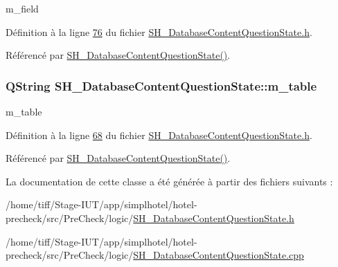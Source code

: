 m\-\_\-field 



Définition à la ligne \hyperlink{SH__DatabaseContentQuestionState_8h_source_l00076}{76} du fichier \hyperlink{SH__DatabaseContentQuestionState_8h_source}{S\-H\-\_\-\-Database\-Content\-Question\-State.\-h}.



Référencé par \hyperlink{classSH__DatabaseContentQuestionState_ab26490ea519262a8f9ca72c000bf7313}{S\-H\-\_\-\-Database\-Content\-Question\-State()}.

\hypertarget{classSH__DatabaseContentQuestionState_a95d8a6ffc051cd9283314a56f7a11296}{
\subsubsection[{m\-\_\-table}]{\setlength{\rightskip}{0pt plus 5cm}Q\-String S\-H\-\_\-\-Database\-Content\-Question\-State\-::m\-\_\-table\hspace{0.3cm}{\ttfamily [private]}}}\label{classSH__DatabaseContentQuestionState_a95d8a6ffc051cd9283314a56f7a11296}


m\-\_\-table 



Définition à la ligne \hyperlink{SH__DatabaseContentQuestionState_8h_source_l00068}{68} du fichier \hyperlink{SH__DatabaseContentQuestionState_8h_source}{S\-H\-\_\-\-Database\-Content\-Question\-State.\-h}.



Référencé par \hyperlink{classSH__DatabaseContentQuestionState_ab26490ea519262a8f9ca72c000bf7313}{S\-H\-\_\-\-Database\-Content\-Question\-State()}.



La documentation de cette classe a été générée à partir des fichiers suivants \-:\begin{DoxyCompactItemize}
\item 
/home/tiff/\-Stage-\/\-I\-U\-T/app/simplhotel/hotel-\/precheck/src/\-Pre\-Check/logic/\hyperlink{SH__DatabaseContentQuestionState_8h}{S\-H\-\_\-\-Database\-Content\-Question\-State.\-h}\item 
/home/tiff/\-Stage-\/\-I\-U\-T/app/simplhotel/hotel-\/precheck/src/\-Pre\-Check/logic/\hyperlink{SH__DatabaseContentQuestionState_8cpp}{S\-H\-\_\-\-Database\-Content\-Question\-State.\-cpp}\end{DoxyCompactItemize}
